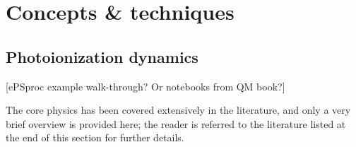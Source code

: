 \section{Concepts \& techniques}

\subsection{Photoionization dynamics} 
[ePSproc example walk-through? Or notebooks from QM book?]

The core physics  has been covered extensively in the literature, and only a very brief overview is provided here; the reader is referred to the literature listed at the end of this section for further details.